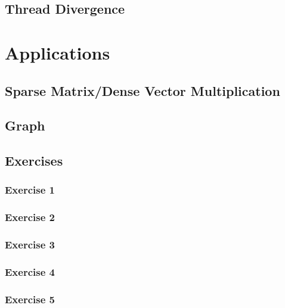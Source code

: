 \documentclass[12px,oz]{report}
\theoremstyle{indented}
\theoremstyle{indented}
\begin{document}
\section{Thread Divergence}
\label{sec-thread-div}


\chapter{Applications}
\label{ch-app}

	
	\section{Sparse Matrix/Dense Vector Multiplication}
	\label{sec-matrix}
	
	
	\section{Graph}
	\label{sec-graph}
	
	
	\section{Exercises}
	\label{sec:exercises}
	
	
		\subsection{Exercise 1}
		\label{sec:exercise1}
		
		
		\subsection{Exercise 2}
		\label{sec:exercise2}
		
		
		\subsection{Exercise 3}
		\label{sec:exercise3}
		
		
		\subsection{Exercise 4}
		\label{sec:exercise4}
		
		
		\subsection{Exercise 5}
		\label{sec:exercise5}
		
		
\end{document}
